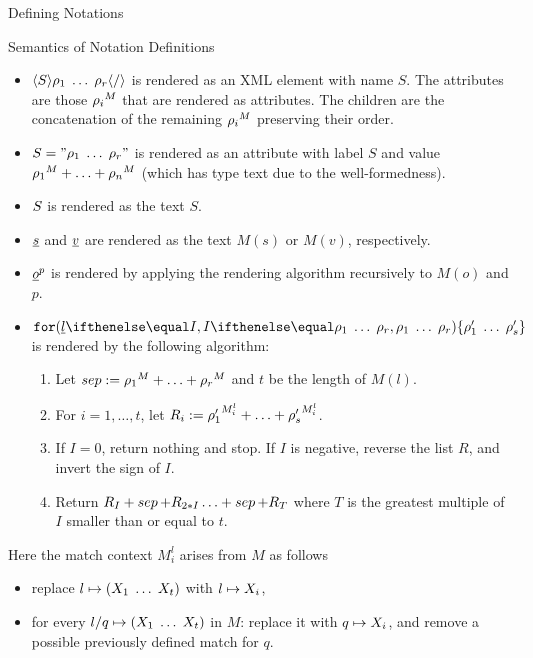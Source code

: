 \begin{omgroup}[creators=miko,short={Notation and Presentation},id=pres]
\begin{omgroup}[creators={miko,frabe},id=sec:ntn-definition]{Defining Notations}
\begin{omgroup}[id=sec:nd:semantics]{Semantics of Notation Definitions}
\begin{itemize}
	\item $\langle S\rangle\rho_1\;\ldots\;\rho_r\langle/\rangle$ is rendered as an XML element with name $S$. The attributes are those ${\rho_i}^{M}$ that are rendered as attributes. The children are the concatenation of the remaining ${\rho_i}^{M}$ preserving their order.
	\item $S="\rho_1\;\ldots\;\rho_r"$ is rendered as an attribute with label $S$ and value ${\rho_1}^{M}+\ldots +{\rho_n}^{M}$ (which has type text due to the well-formedness).
	\item ${S}$ is rendered as the text $S$.
	\item $\underline{s}$ and $\underline{v}$ are rendered as the text $M(s)$ or $M(v)$, respectively.
	\item $\underline{o}^{p}$ is rendered by applying the rendering algorithm recursively to $M(o)$ and $p$.
	\item $\PIIterate[I]{l}{\rho_1\;\ldots\;\rho_r}{\rho'_1\;\ldots\;\rho'_s}$ is rendered by the following algorithm:
	  \begin{enumerate}
	    \item Let $\mathop{sep}:={\rho_1}^{M}+\ldots+{\rho_r}^{M}$ and $t$ be the length of $M(l)$.
	    \item For $i=1,\ldots,t$, let $R_i:={\rho'_1}^{M^l_i}+\ldots+{\rho'_s}^{M^l_i}$.
	    \item If $I=0$, return nothing and stop. If $I$ is negative, reverse the list $R$, and invert the sign of $I$.
	    \item Return $R_{I}+\mathop{sep}+R_{2*I}\ldots+\mathop{sep}+R_{T}$ where $T$ is the greatest multiple of $I$ smaller than or equal to $t$.
    \end{enumerate}
\end{itemize}
Here the match context $M^l_i$ arises from $M$ as follows
\begin{itemize}
	\item replace $l\mapsto (X_1\;\ldots\;X_t)$ with $l\mapsto X_i$,
	\item for every $l/q\mapsto (X_1\;\ldots\;X_t)$ in $M$: replace it with $q\mapsto X_i$, and remove a possible previously defined match for $q$.
\end{itemize}


\end{omgroup}
\end{omgroup}
\end{omgroup}
